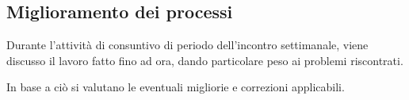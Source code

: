 \documentclass[a4paper, 12pt]{article}
\begin{document}
\subsection{Miglioramento dei processi}
Durante l'attività di consuntivo di periodo dell'incontro settimanale, viene discusso il lavoro fatto fino ad ora, dando particolare peso ai problemi riscontrati. 

In base a ciò si valutano le eventuali migliorie e correzioni applicabili.
\end{document}

